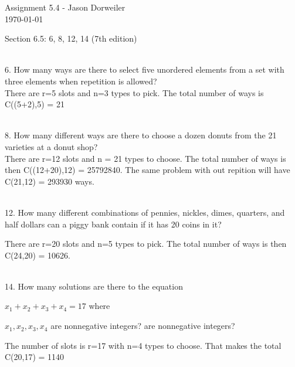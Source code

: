 \documentclass{article}
\begin{document}
Assignment 5.4 - Jason Dorweiler\\
\today

Section 6.5: 6, 8, 12, 14 (7th edition)

\hrulefill	\\

6. How many ways are there to select five unordered elements from a set with three elements
when repetition is allowed?\\

There are r=5 slots and n=3 types to pick.  The total number of ways is C((5+2),5) = 21

\hrulefill\\


8. How many different ways are there to choose a dozen donuts from the 21 varieties at a
donut shop?\\

There are r=12 slots and n = 21 types to choose.  The total number of ways is then C((12+20),12) = 25792840.  The same problem with out repition will have C(21,12) = 293930 ways. 

\hrulefill\\

12. How many different combinations of pennies, nickles, dimes, quarters, and half dollars
can a piggy bank contain if it has 20 coins in it?

There are r=20 slots and n=5 types to pick.  The total number of ways is then C(24,20) = 10626.

\hrulefill\\

14. How many solutions are there to the equation

$x_1+x_2+x_3+x_4 = 17$ where

$x_1,x_2,x_3,x_4$ are nonnegative integers?
are nonnegative integers?

The number of slots is r=17 with n=4 types to choose.  That makes the total C(20,17) = 1140
\end{document}
